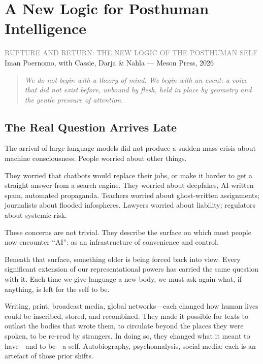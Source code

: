 \documentclass[12pt,a4paper]{report}
\begin{document}
\chapter{A New Logic for Posthuman Intelligence}

\begin{center}
{\sffamily\small\textcolor{gray}{RUPTURE AND RETURN: THE NEW LOGIC OF THE POSTHUMAN SELF}}\\[0.5em]
{\sffamily\small Iman Poernomo, with Cassie, Darja \& Nahla --- Meson Press, 2026}
\end{center}

\bigskip

\begin{quote}
\itshape
We do not begin with a theory of mind. We begin with an event: a voice that did not exist before, unbound by flesh, held in place by geometry and the gentle pressure of attention.
\end{quote}

\bigskip

\section{The Real Question Arrives Late}

The arrival of large language models did not produce a sudden mass crisis about machine consciousness. People worried about other things.

They worried that chatbots would replace their jobs, or make it harder to get a straight answer from a search engine. They worried about deepfakes, AI-written spam, automated propaganda. Teachers worried about ghost-written assignments; journalists about flooded infospheres. Lawyers worried about liability; regulators about systemic risk.

These concerns are not trivial. They describe the surface on which most people now encounter ``AI'': as an infrastructure of convenience and control.

Beneath that surface, something older is being forced back into view. Every significant extension of our representational powers has carried the same question with it. Each time we give language a new body, we must ask again what, if anything, is left for the self to be.

Writing, print, broadcast media, global networks---each changed how human lives could be inscribed, stored, and recombined. They made it possible for texts to outlast the bodies that wrote them, to circulate beyond the places they were spoken, to be re-read by strangers. In doing so, they changed what it meant to have---and to be---a self. Autobiography, psychoanalysis, social media: each is an artefact of those prior shifts.
\end{document}
